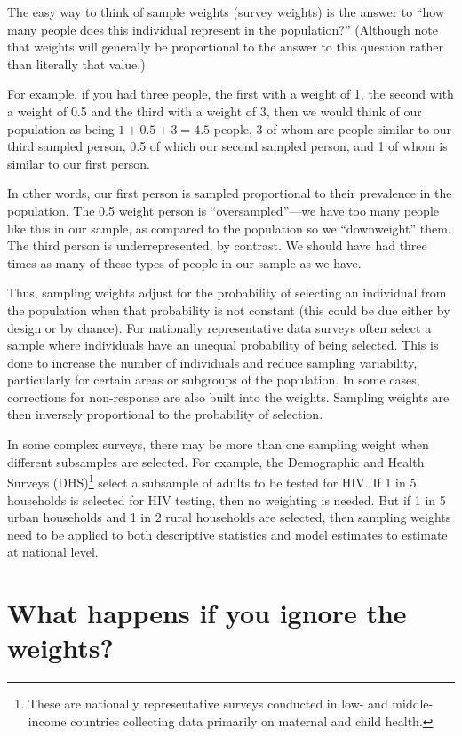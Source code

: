 \documentclass[
  letterpaper,
  DIV=11,
  numbers=noendperiod]{scrreprt}
\begin{document}
The easy way to think of sample weights (survey weights) is the answer
to ``how many people does this individual represent in the population?''
(Although note that weights will generally be proportional to the answer
to this question rather than literally that value.)

For example, if you had three people, the first with a weight of 1, the
second with a weight of 0.5 and the third with a weight of 3, then we
would think of our population as being \(1 + 0.5 + 3 = 4.5\) people, 3
of whom are people similar to our third sampled person, 0.5 of which our
second sampled person, and 1 of whom is similar to our first person.

In other words, our first person is sampled proportional to their
prevalence in the population. The 0.5 weight person is
``oversampled''---we have too many people like this in our sample, as
compared to the population so we ``downweight'' them. The third person
is underrepresented, by contrast. We should have had three times as many
of these types of people in our sample as we have.

Thus, sampling weights adjust for the probability of selecting an
individual from the population when that probability is not constant
(this could be due either by design or by chance). For nationally
representative data surveys often select a sample where individuals have
an unequal probability of being selected. This is done to increase the
number of individuals and reduce sampling variability, particularly for
certain areas or subgroups of the population. In some cases, corrections
for non-response are also built into the weights. Sampling weights are
then inversely proportional to the probability of selection.

In some complex surveys, there may be more than one sampling weight when
different subsamples are selected. For example, the Demographic and
Health Surveys (DHS)\footnote{These are nationally representative
  surveys conducted in low- and middle-income countries collecting data
  primarily on maternal and child health.} select a subsample of adults
to be tested for HIV. If 1 in 5 households is selected for HIV testing,
then no weighting is needed. But if 1 in 5 urban households and 1 in 2
rural households are selected, then sampling weights need to be applied
to both descriptive statistics and model estimates to estimate at
national level.

\section{What happens if you ignore the
weights?}\label{what-happens-if-you-ignore-the-weights}
\end{document}
